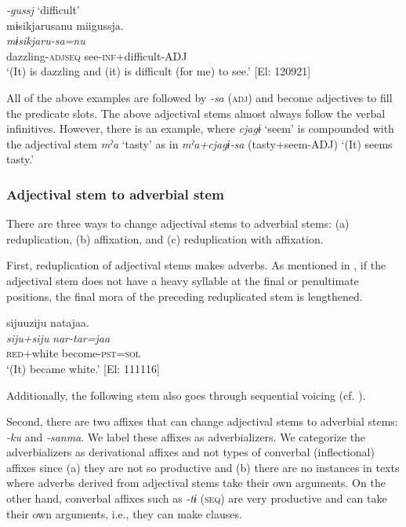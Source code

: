 \ex \textit{{}-gussj} ‘difficult’\\
\glll      mɨsikjarusanu  miigussja.\\
      \textit{mɨsikjaru-sa=nu}  \textit{}\\
      dazzling-\textsc{adj}\textsc{seq}  see-\textsc{inf}+difficult-ADJ\\
      \glt       ‘(It) is dazzling and (it) is difficult (for me) to see.’ [El: 120921]
     \z
\z

All of the above examples are followed by \textit{{}-sa} (\textsc{adj}) and become adjectives to fill the predicate slots. The above adjectival stems almost always follow the verbal infinitives. However, there is an example, where \textit{cjagɨ} ‘seem’ is compounded with the adjectival stem \textit{mˀa} ‘tasty’ as in \textit{mˀa+cjagɨ-sa} (tasty+seem-ADJ) ‘(It) seems tasty.’

\subsubsection{Adjectival stem to adverbial stem}\label{sec:4.3.8.3}

There are three ways to change adjectival stems to adverbial stems: (a) reduplication, (b) affixation, and (c) reduplication with affixation.

  First, reduplication of adjectival stems makes adverbs. As mentioned in , if the adjectival stem does not have a heavy syllable at the final or penultimate positions, the final mora of the preceding reduplicated stem is lengthened.

\ea   \label{ex:4.60}
\glll    sijuuziju  natajaa.\\
    \textit{siju+siju}  \textit{nar-tar=jaa}\\
    \textsc{red}+white  become-\textsc{pst}=\textsc{sol}\\
    \glt     ‘(It) became white.’ [El: 111116]
\z

Additionally, the following stem also goes through sequential voicing (cf. ).

Second, there are two affixes that can change adjectival stems to adverbial stems: \textit{{}-ku} and \textit{{}-sanma}. We label these affixes as adverbializers. We categorize the adverbializers as derivational affixes and not types of converbal (inflectional) affixes since (a) they are not so productive and (b) there are no instances in texts where adverbs derived from adjectival stems take their own arguments. On the other hand, converbal affixes such as \textit{{}-tɨ} (\textsc{seq}) are very productive and can take their own arguments, i.e., they can make clauses.


